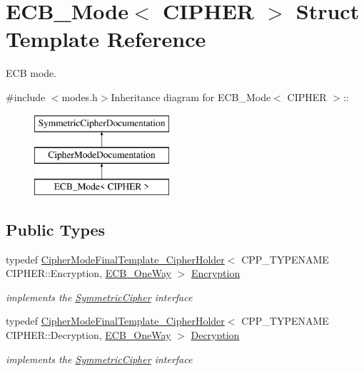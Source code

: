 \hypertarget{struct_e_c_b___mode}{
\section{ECB\_\-Mode$<$ CIPHER $>$ Struct Template Reference}
\label{struct_e_c_b___mode}
}


ECB mode.  


{\ttfamily \#include $<$modes.h$>$}Inheritance diagram for ECB\_\-Mode$<$ CIPHER $>$::\begin{figure}[H]
\begin{center}
\leavevmode
\includegraphics[height=3cm]{struct_e_c_b___mode}
\end{center}
\end{figure}
\subsection*{Public Types}
\begin{DoxyCompactItemize}
\item 
\hypertarget{struct_e_c_b___mode_af5799c8c04652b1876dee69c2a72aff1}{
typedef \hyperlink{class_cipher_mode_final_template___cipher_holder}{CipherModeFinalTemplate\_\-CipherHolder}$<$ CPP\_\-TYPENAME CIPHER::Encryption, \hyperlink{class_e_c_b___one_way}{ECB\_\-OneWay} $>$ \hyperlink{struct_e_c_b___mode_af5799c8c04652b1876dee69c2a72aff1}{Encryption}}
\label{struct_e_c_b___mode_af5799c8c04652b1876dee69c2a72aff1}

\begin{DoxyCompactList}\small\item\em implements the \hyperlink{class_symmetric_cipher}{SymmetricCipher} interface \item\end{DoxyCompactList}\item 
\hypertarget{struct_e_c_b___mode_aeaed489e7c4eedf0f8340af8d7dab34e}{
typedef \hyperlink{class_cipher_mode_final_template___cipher_holder}{CipherModeFinalTemplate\_\-CipherHolder}$<$ CPP\_\-TYPENAME CIPHER::Decryption, \hyperlink{class_e_c_b___one_way}{ECB\_\-OneWay} $>$ \hyperlink{struct_e_c_b___mode_aeaed489e7c4eedf0f8340af8d7dab34e}{Decryption}}
\label{struct_e_c_b___mode_aeaed489e7c4eedf0f8340af8d7dab34e}

\begin{DoxyCompactList}\small\item\em implements the \hyperlink{class_symmetric_cipher}{SymmetricCipher} interface \item\end{DoxyCompactList}\end{DoxyCompactItemize}


